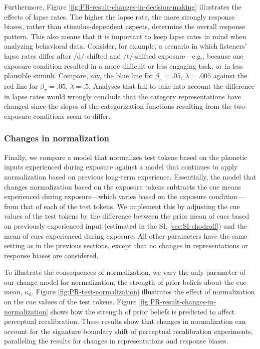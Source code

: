 \documentclass[
  11pt,
  man,floatsintext]{apa6}
\begin{document}
Furthermore, Figure \ref{fig:PR-result-changes-in-decision-making} illustrates the effects of lapse rates. The higher the lapse rate, the more strongly response biases, rather than stimulus-dependent aspects, determine the overall response pattern. This also means that it is important to keep lapse rates in mind when analyzing behavioral data. Consider, for example, a scenario in which listeners' lapse rates differ after /d/-shifted and /t/-shifted exposure---e.g., because one exposure condition resulted in a more difficult or less engaging task, or in less plausible stimuli. Compare, say, the blue line for \(\beta_{\pi} = .05\), \(\lambda = .005\) against the red line for \(\beta_{\pi} = .05\), \(\lambda = .5\). Analyses that fail to take into account the difference in lapse rates would wrongly conclude that the category representations have changed since the slopes of the categorization functions resulting from the two exposure conditions seem to differ.

\hypertarget{changes-in-normalization}{%
\subsubsection{Changes in normalization}\label{changes-in-normalization}}

Finally, we compare a model that normalizes test tokens based on the phonetic inputs experienced during exposure against a model that continues to apply normalization based on previous long-term experience. Essentially, the model that changes normalization based on the exposure tokens subtracts the cue means experienced during exposure---which varies based on the exposure condition---from that of each of the test tokens. We implement this by adjusting the cue values of the test tokens by the difference between the prior mean of cues based on previously experienced input (estimated in the SI, \ref{sec:SI-chodroff}) and the mean of cues experienced during exposure. All other parameters have the same setting as in the previous sections, except that no changes in representations or response biases are considered.

To illustrate the consequences of normalization, we vary the only parameter of our change model for normalization, the strength of prior beliefs about the cue mean, \(\kappa_0\). Figure \ref{fig:PR-test-normalization} illustrates the effect of normalization on the cue values of the test tokens. Figure \ref{fig:PR-result-changes-in-normalization} shows how the strength of prior beliefs is predicted to affect perceptual recalibration. These results show that changes in normalization can account for the signature boundary shift of perceptual recalibration experiments, paralleling the results for changes in representations and response biases.
\end{document}
